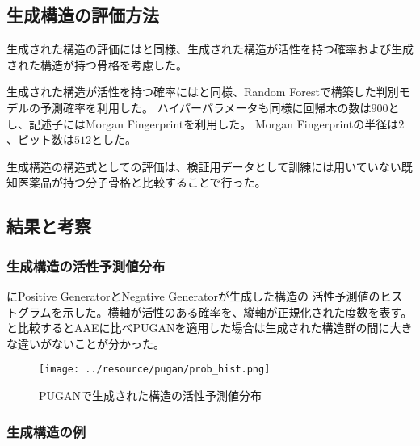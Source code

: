 \subsection{生成構造の評価方法}

生成された構造の評価にはと同様、生成された構造が活性を持つ確率および生成された構造が持つ骨格を考慮した。

生成された構造が活性を持つ確率にはと同様、Random Forestで構築した判別モデルの予測確率を利用した。
ハイパーパラメータも同様に回帰木の数は$900$とし、記述子にはMorgan Fingerprintを利用した。
Morgan Fingerprintの半径は$2$、ビット数は$512$とした。

生成構造の構造式としての評価は、検証用データとして訓練には用いていない既知医薬品が持つ分子骨格と比較することで行った。

\subsection{結果と考察}

\subsubsection{生成構造の活性予測値分布}

にPositive GeneratorとNegative Generatorが生成した構造の
活性予測値のヒストグラムを示した。横軸が活性のある確率を、縦軸が正規化された度数を表す。
と比較するとAAEに比べPUGANを適用した場合は生成された構造群の間に大きな違いがないことが分かった。
\begin{figure}[tbp]
    \centering
    \texttt{[image: ../resource/pugan/prob\_hist.png]}
    \caption{PUGANで生成された構造の活性予測値分布} \label{fig:pugan_prob_hist}
\end{figure}

\subsubsection{生成構造の例}

